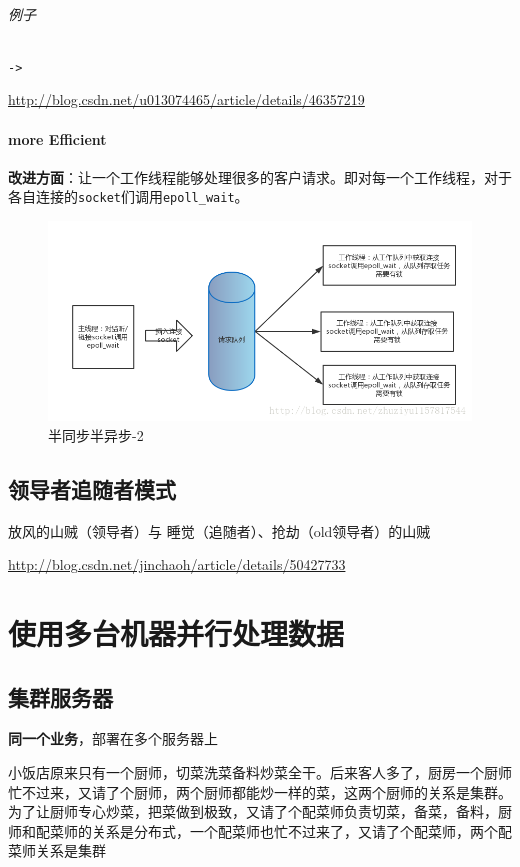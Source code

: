\documentclass[UTF8,a4paper,12pt]{ctexbook}
\begin{document}
				\subparagraph{例子}\verb|->| 
				
					\url{http://blog.csdn.net/u013074465/article/details/46357219}
			\subsubsection{more Efficient}
				\textbf{改进方面}：让一个工作线程能够处理很多的客户请求。即对每一个工作线程，对于各自连接的\verb|socket|们调用\verb|epoll_wait|。
				
				\begin{figure}[h]
					\centering
					\includegraphics[scale = 0.5]{figures/half2.png}
					\caption{半同步半异步-2}
				\end{figure}
				
	\newpage
	\section{领导者追随者模式}
		放风的山贼（领导者）与 睡觉（追随者）、抢劫（old领导者）的山贼
		
		\url{http://blog.csdn.net/jinchaoh/article/details/50427733}
	
	
\chapter{使用多台机器并行处理数据}
	\section{集群服务器}
			\textbf{同一个业务}，部署在多个服务器上
			
			小饭店原来只有一个厨师，切菜洗菜备料炒菜全干。后来客人多了，厨房一个厨师忙不过来，又请了个厨师，两个厨师都能炒一样的菜，这两个厨师的关系是集群。为了让厨师专心炒菜，把菜做到极致，又请了个配菜师负责切菜，备菜，备料，厨师和配菜师的关系是分布式，一个配菜师也忙不过来了，又请了个配菜师，两个配菜师关系是集群
			
\end{document}
